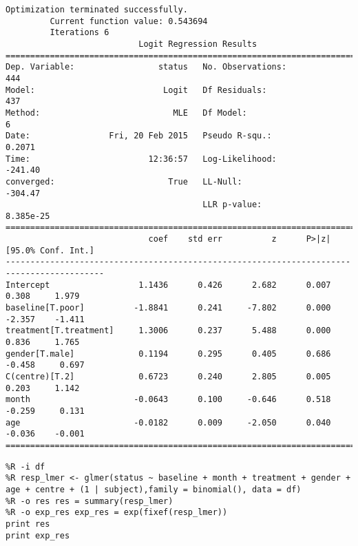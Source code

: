 \documentclass[12pt,fleqn]{article}\usepackage{../common}
\begin{document}
\begin{verbatim}
Optimization terminated successfully.
         Current function value: 0.543694
         Iterations 6
                           Logit Regression Results                           
==============================================================================
Dep. Variable:                 status   No. Observations:                  444
Model:                          Logit   Df Residuals:                      437
Method:                           MLE   Df Model:                            6
Date:                Fri, 20 Feb 2015   Pseudo R-squ.:                  0.2071
Time:                        12:36:57   Log-Likelihood:                -241.40
converged:                       True   LL-Null:                       -304.47
                                        LLR p-value:                 8.385e-25
==========================================================================================
                             coef    std err          z      P>|z|      [95.0% Conf. Int.]
------------------------------------------------------------------------------------------
Intercept                  1.1436      0.426      2.682      0.007         0.308     1.979
baseline[T.poor]          -1.8841      0.241     -7.802      0.000        -2.357    -1.411
treatment[T.treatment]     1.3006      0.237      5.488      0.000         0.836     1.765
gender[T.male]             0.1194      0.295      0.405      0.686        -0.458     0.697
C(centre)[T.2]             0.6723      0.240      2.805      0.005         0.203     1.142
month                     -0.0643      0.100     -0.646      0.518        -0.259     0.131
age                       -0.0182      0.009     -2.050      0.040        -0.036    -0.001
==========================================================================================
\end{verbatim}



\begin{verbatim}
%R -i df 
%R resp_lmer <- glmer(status ~ baseline + month + treatment + gender + age + centre + (1 | subject),family = binomial(), data = df)
%R -o res res = summary(resp_lmer)
%R -o exp_res exp_res = exp(fixef(resp_lmer))
print res
print exp_res
\end{verbatim}
\end{document}
